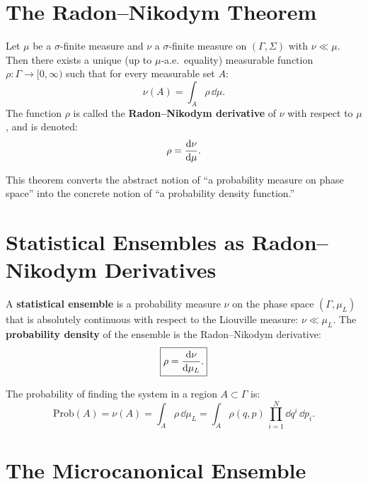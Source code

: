 \section{The Radon--Nikodym Theorem}

\begin{theorem}
Let $\mu$ be a $\sigma$-finite measure and $\nu$ a $\sigma$-finite measure on $(\Gamma, \Sigma)$ with $\nu \ll \mu$. Then there exists a unique (up to $\mu$-a.e.\ equality) measurable function $\rho: \Gamma \to [0, \infty)$ such that for every measurable set $A$:
\begin{equation}
\boxed{\nu(A) = \int_A \rho\,\dd\mu.}
\end{equation}
The function $\rho$ is called the \textbf{Radon--Nikodym derivative} of $\nu$ with respect to $\mu$, and is denoted:
\begin{equation}
\rho = \dv{\nu}{\mu}.
\end{equation}
\end{theorem}

This theorem converts the abstract notion of ``a probability measure on phase space'' into the concrete notion of ``a probability density function.''

\section{Statistical Ensembles as Radon--Nikodym Derivatives}

\begin{definition}
A \textbf{statistical ensemble} is a probability measure $\nu$ on the phase space $(\Gamma, \mu_L)$ that is absolutely continuous with respect to the Liouville measure: $\nu \ll \mu_L$. The \textbf{probability density} of the ensemble is the Radon--Nikodym derivative:
\begin{equation}
\boxed{\rho = \dv{\nu}{\mu_L}.}
\end{equation}
\end{definition}

The probability of finding the system in a region $A \subset \Gamma$ is:
\begin{equation}
\text{Prob}(A) = \nu(A) = \int_A \rho\,\dd\mu_L = \int_A \rho(q,p)\,\prod_{i=1}^N \dd q^i\,\dd p_i.
\end{equation}

\section{The Microcanonical Ensemble}

